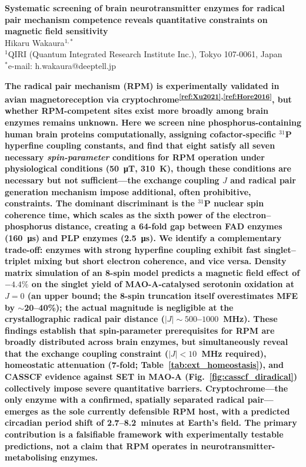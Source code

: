 \documentclass[11pt]{article}
\begin{document}
 
 
\begin{center}  
{\LARGE\bfseries Systematic screening of brain neurotransmitter enzymes for radical pair mechanism competence reveals quantitative constraints on magnetic field sensitivity}\\[1.5em]
{\large Hikaru Wakaura$^{1,*}$}\\[0.5em]
{\small $^1$QIRI (Quantum Integrated Research Institute Inc.), Tokyo 107-0061, Japan}\\
{\small $^*$e-mail: h.wakaura@deeptell.jp}\\[1em]
\end{center} 
 
 
\noindent\textbf{%
The radical pair mechanism (RPM) is experimentally validated in avian magnetoreception via cryptochrome\textsuperscript{\ref{ref:Xu2021},\ref{ref:Hore2016}}, but whether RPM-competent sites exist more broadly among brain enzymes remains unknown. Here we screen nine phosphorus-containing human brain proteins computationally, assigning cofactor-specific $^{31}$P hyperfine coupling constants, and find that eight satisfy all seven necessary \emph{spin-parameter} conditions for RPM operation under physiological conditions (50~\si{\micro\tesla}, 310~K), though these conditions are necessary but not sufficient---the exchange coupling $J$ and radical pair generation mechanism impose additional, often prohibitive, constraints. The dominant discriminant is the $^{31}$P nuclear spin coherence time, which scales as the sixth power of the electron--phosphorus distance, creating a 64-fold gap between FAD enzymes (160~\si{\micro\second}) and PLP enzymes (2.5~\si{\micro\second}). We identify a complementary trade-off: enzymes with strong hyperfine coupling exhibit fast singlet--triplet mixing but short electron coherence, and vice versa. Density matrix simulation of an 8-spin model predicts a magnetic field effect of $-4.4\%$ on the singlet yield of MAO-A-catalysed serotonin oxidation at $J = 0$ (an upper bound; the 8-spin truncation itself overestimates MFE by $\sim$20--40\%); the actual magnitude is negligible at the crystallographic radical pair distance ($|J| \sim 500$--$1000$~MHz). These findings establish that spin-parameter prerequisites for RPM are broadly distributed across brain enzymes, but simultaneously reveal that the exchange coupling constraint ($|J| < 10$~MHz required), homeostatic attenuation (7-fold; Table~\ref{tab:ext_homeostasis}), and CASSCF evidence against SET in MAO-A (Fig.~\ref{fig:casscf_diradical}) collectively impose severe quantitative barriers. Cryptochrome---the only enzyme with a confirmed, spatially separated radical pair---emerges as the sole currently defensible RPM host, with a predicted circadian period shift of 2.7--8.2~minutes at Earth's field. The primary contribution is a falsifiable framework with experimentally testable predictions, not a claim that RPM operates in neurotransmitter-metabolising enzymes.%
}
 
\end{document}
